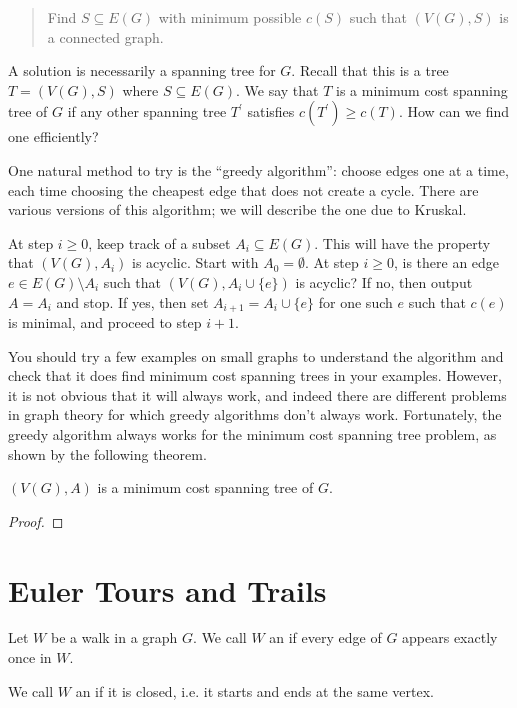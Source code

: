 \begin{quote}
Find $S\subseteq E(G)$ with minimum possible $c(S)$ such that $(V(G),S)$ is a connected graph.
\end{quote}

A solution is necessarily a spanning tree for $G$. Recall that this is a tree $T=(V(G),S)$ where $S\subseteq E(G)$. We say that $T$ is a minimum cost spanning tree of $G$ if any other spanning tree $T^\prime$ satisfies $c(T^\prime)\ge c(T)$. How can we find one efficiently?

One natural method to try is the ``greedy algorithm'': choose edges one at a time, each time choosing the cheapest edge that does not create a cycle. There are various versions of this algorithm; we will describe the one due to Kruskal.

\begin{theorem}
At step $i\ge0$, keep track of a subset $A_i\subseteq E(G)$. This will have the property that $(V(G),A_i)$ is acyclic. Start with $A_0=\emptyset$. At step $i\ge0$, is there an edge $e\in E(G)\setminus A_i$ such that $(V(G),A_i\cup\{e\})$ is acyclic? If no, then output $A=A_i$ and stop. If yes, then set $A_{i+1}=A_i\cup\{e\}$ for one such $e$ such that $c(e)$ is minimal, and proceed to step $i+1$.
\end{theorem}

You should try a few examples on small graphs to understand the algorithm and check that it does find minimum cost spanning trees in your examples. However, it is not obvious that it will always work, and indeed there are different problems in graph theory for which greedy algorithms don't always work. Fortunately, the greedy algorithm always works for the minimum cost spanning tree problem, as shown by the following theorem.

\begin{theorem}
$(V(G),A)$ is a minimum cost spanning tree of $G$.
\end{theorem}

\begin{proof}

\end{proof}

\section{Euler Tours and Trails}
\begin{definition}
Let $W$ be a walk in a graph $G$. We call $W$ an  if every edge of $G$ appears exactly once in $W$. 

We call $W$ an  if it is closed, i.e. it starts and ends at the same vertex.
\end{definition}

